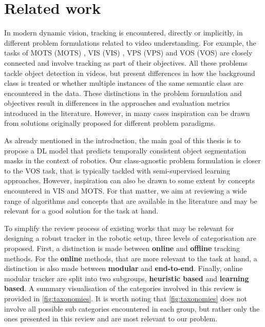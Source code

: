 

\chapter{Related work}\label{chapter:Related_work_tracking}

In modern dynamic vision, tracking is encountered, directly or implicitly, in different problem formulations related to video understanding. For example, the tasks of \acrlong{MOTS} (\acrshort{MOTS}) \parencite{mots20}, \acrlong{VIS} (\acrshort{VIS}) \parencite{Yang2019vis}, \acrlong{VPS} (\acrshort{VPS}) \parencite{kim2020vps} and \acrlong{VOS} (\acrshort{VOS}) \parencite{davis} are closely connected and involve tracking as part of their objectives. All these problems tackle object detection in videos, but present differences in how the background class is treated or whether multiple instances of the same semantic class are encountered in the data.
These distinctions in the problem formulation and objectives result in differences in the approaches and evaluation metrics introduced in the literature. However, in many cases inspiration can be drawn from solutions originally proposed for different problem paradigms. \par

As already mentioned in the introduction, the main goal of this thesis is to propose a DL model that predicts temporally consistent object segmentation masks in the context of robotics. Our class-agnostic problem formulation is closer to the VOS task, that is typically tackled with semi-supervised learning approaches. However, inspiration can also be drawn to some extent by concepts encountered in VIS and MOTS. For that matter, we aim at reviewing a wide range of algorithms and concepts that are available in the literature and may be relevant for a good solution for the task at hand.\par

To simplify the review process of existing works that may be relevant for designing a robust tracker in the robotic setup, three levels of categorisation are proposed. First, a distinction is made between \textbf{online} and \textbf{offline} tracking methods. For the \textbf{online} methods, that are more relevant to the task at hand, a distinction is also made between \textbf{modular} and \textbf{end-to-end}. Finally, online modular tracker are split into two subgroups, \textbf{heuristic based} and \textbf{learning based}. A summary visualisation of the categories involved in this review is provided in \figref\ref{fig:taxonomies}. It is worth noting that \figref\ref{fig:taxonomies} does not involve all possible sub categories encountered in each group, but rather only the ones presented in this review and are most relevant to our problem. \par


